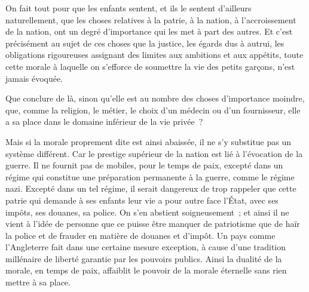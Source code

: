 \documentclass[french,twoside]{book} %
\begin{document}
On fait tout pour que les enfants sentent, et ils le sentent d'ailleurs naturellement, que les choses relatives à la patrie, à la nation, à l'accroissement de la nation, ont un degré d'importance qui les met à part des autres. Et c'est précisément au sujet de ces choses que la justice, les égards dus à autrui, les obligations rigoureuses assignant des limites aux ambitions et aux appétits, toute cette morale à laquelle on s'efforce de soumettre la vie des petits garçons, n'est jamais évoquée.\par
Que conclure de là, sinon qu'elle est au nombre des choses d'importance moindre, que, comme la religion, le métier, le choix d'un médecin ou d'un fournisseur, elle a sa place dans le domaine inférieur de la vie privée ?\par
Mais si la morale proprement dite est ainsi abaissée, il ne s'y substitue pas un système différent. Car le prestige supérieur de la nation est lié à l'évocation de la guerre. Il ne fournit pas de mobiles, pour le temps de paix, excepté dans un régime qui constitue une préparation permanente à la guerre, comme le régime nazi. Excepté dans un tel régime, il serait dangereux de trop rappeler que cette patrie qui demande à ses enfants leur vie a pour autre face l'État, avec ses impôts, ses douanes, sa police. On s'en abstient soigneusement ; et ainsi il ne vient à l'idée de personne que ce puisse être manquer de patriotisme que de haïr la police et de frauder en matière de douanes et d'impôt. Un pays comme l'Angleterre fait dans une certaine mesure exception, à cause d'une tradition millénaire de liberté garantie par les pouvoirs publics. Ainsi la dualité de la morale, en temps de paix, affaiblit le pouvoir de la morale éternelle sans rien mettre à sa place.\par
\end{document}
